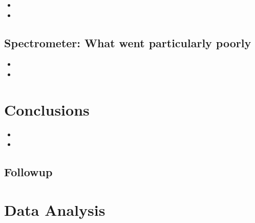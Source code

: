\begin{itemize}
\item{}
\item{}
\end{itemize}

\subsection{Spectrometer: {\color{red} What went particularly poorly}}

\begin{itemize}
\item{}
\item{}
\end{itemize}


\section{Conclusions}

\begin{itemize}
\item{}
\item{}
\end{itemize}


\subsection{Followup}


\newpage

\section{Data Analysis}

